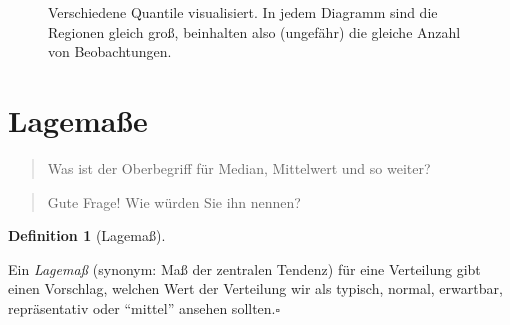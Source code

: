 \documentclass[
  a4paper,
]{scrbook}
\theoremstyle{definition}
\theoremstyle{definition}
\newtheorem{definition}{Definition}[chapter]
\theoremstyle{definition}
\theoremstyle{remark}
\begin{document}
\begin{figure}
\begin{minipage}{0.33\linewidth}


\end{minipage}%

\caption{\label{fig-quantile-mosaic}Verschiedene Quantile visualisiert.
In jedem Diagramm sind die Regionen gleich groß, beinhalten also
(ungefähr) die gleiche Anzahl von Beobachtungen.}

\end{figure}%

\section{Lagemaße}\label{sec-lage}

\begin{quote}
{} Was ist der Oberbegriff für Median, Mittelwert und so
weiter?
\end{quote}

\begin{quote}
{} Gute Frage! Wie würden Sie ihn nennen?
\end{quote}

\begin{definition}[Lagemaß]\protect\hypertarget{def-lage}{}\label{def-lage}

Ein \emph{Lagemaß} (synonym: Maß der zentralen Tendenz) für eine
Verteilung gibt einen Vorschlag, welchen Wert der Verteilung wir als
typisch, normal, erwartbar, repräsentativ oder ``mittel'' ansehen
sollten.\(\square\)

\end{definition}
\end{document}
